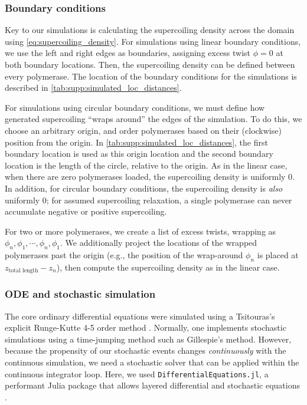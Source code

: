 \documentclass[11pt]{article} %
\begin{document}
\subsubsection{Boundary conditions} \label{sec:appendix:bcs}

Key to our simulations is calculating the supercoiling density across the domain using \cref{eq:supercoiling_density}.
For simulations using linear boundary conditions, we use the left and right edges as boundaries, assigning excess twist \(\phi = 0\) at both boundary locations. Then, the supercoiling density can be defined between every polymerase. The location of the boundary conditions for the simulations is described in \cref{tab:supp:simulated_loc_distances}.

For simulations using circular boundary conditions, we must define how generated supercoiling ``wraps around'' the edges of the simulation. To do this, we choose an arbitrary origin, and order polymerases based on their (clockwise) position from the origin. In \cref{tab:supp:simulated_loc_distances}, the first boundary location is used as this origin location and the second boundary location is the length of the circle, relative to the origin. As in the linear case, when there are zero polymerases loaded, the supercoiling density is uniformly 0. In addition, for circular boundary conditions, the supercoiling density is \emph{also} uniformly 0; for assumed supercoiling relaxation, a single polymerase can never accumulate negative or positive supercoiling.

For two or more polymerases, we create a list of excess twists, wrapping as \(\phi_{n}, \phi_1, \cdots, \phi_n, \phi_1\). We additionally project the locations of the wrapped polymerases past the origin (e.g., the position of the wrap-around \(\phi_n\) is placed at \(z_\text{total length} - z_n\)), then compute the supercoiling density as in the linear case.

\subsubsection{ODE and stochastic simulation}
The core ordinary differential equations were simulated using a Tsitouras's explicit Runge-Kutte 4-5 order method \parencite{tsitourasRungeKuttaPairs2011}.
Normally, one implements stochastic simulations using a time-jumping method such as Gillespie's method. However, because the propensity of our stochastic events changes \emph{continuously} with the continuous simulation, we need a stochastic solver that can be applied within the continuous integrator loop. Here, we used \texttt{DifferentialEquations.jl}, a performant Julia package that allows layered differential and stochastic equations
\parencite{rackauckasDifferentialEquationsJlPerformant2017}.
\end{document}
